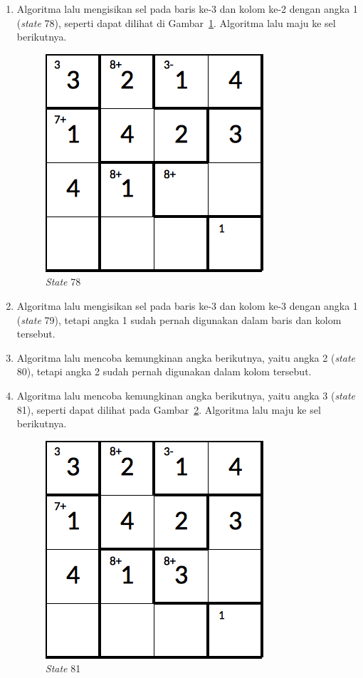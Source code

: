 \begin{enumerate}
\item Algoritma lalu mengisikan sel pada baris ke-3 dan kolom ke-2 dengan angka 1 (\textit{state} 78), seperti dapat dilihat di Gambar~\ref{fig:analisisbt26}. Algoritma lalu maju ke sel berikutnya.

\begin{figure}
\centering
\captionsetup{justification=centering}
\includegraphics[scale=0.333]{Gambar/backtracking/State78}
\caption[\textit{State} 78]{\textit{State} 78}
\label{fig:analisisbt26}
\end{figure}

\item Algoritma lalu mengisikan sel pada baris ke-3 dan kolom ke-3 dengan angka 1 (\textit{state} 79), tetapi angka 1 sudah pernah digunakan dalam baris dan kolom tersebut.
\item Algoritma lalu mencoba kemungkinan angka berikutnya, yaitu angka 2 (\textit{state} 80), tetapi angka 2 sudah pernah digunakan dalam kolom tersebut.
\item Algoritma lalu mencoba kemungkinan angka berikutnya, yaitu angka 3 (\textit{state} 81), seperti dapat dilihat pada Gambar~\ref{fig:analisisbt27}. Algoritma lalu maju ke sel berikutnya.

\begin{figure}
\centering
\captionsetup{justification=centering}
\includegraphics[scale=0.333]{Gambar/backtracking/State81}
\caption[\textit{State} 81]{\textit{State} 81}
\label{fig:analisisbt27}
\end{figure}


\end{enumerate}
